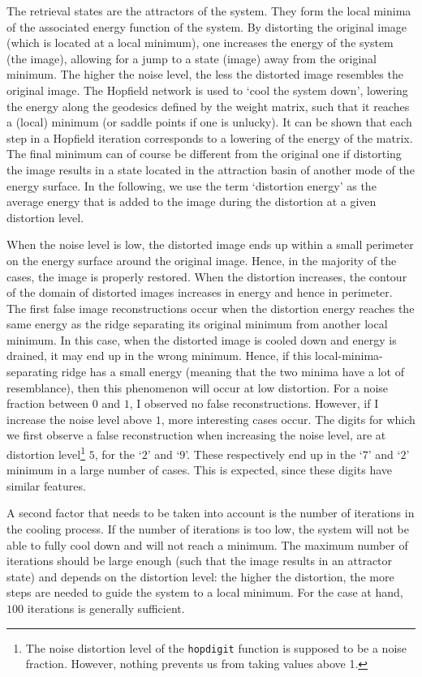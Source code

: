 \documentclass[pdftex,11pt,a4paper]{article}
\begin{document}
The retrieval states are the attractors of the system. They form the local minima of the associated energy function of the system. By distorting the original image (which is located at a local minimum), one increases the energy of the system (the image), allowing for a jump to a state (image) away from the original minimum. The higher the noise level, the less the distorted image resembles the original image. The Hopfield network is used to `cool the system down', lowering the energy along the geodesics defined by the weight matrix, such that it reaches a (local) minimum (or saddle points if one is unlucky). It can be shown that each step in a Hopfield iteration corresponds to a lowering of the energy of the matrix.
The final minimum can of course be different from the original one if distorting the image results in a state located in the attraction basin of another mode of the energy surface. In the following, we use the term `distortion energy' as the average energy that is added to the image during the distortion at a given distortion level.

When the noise level is low, the distorted image ends up within a small perimeter on the energy surface around the original image. Hence, in the majority of the cases, the image is properly restored.
When the distortion increases, the contour of the domain of distorted images increases in energy and hence in perimeter. The first false image reconstructions occur when the distortion energy reaches the same energy as the ridge separating its original minimum from another local minimum. In this case, when the distorted image is cooled down and energy is drained, it may end up in the wrong minimum. Hence, if this local-minima-separating ridge has a small energy (meaning that the two minima have a lot of resemblance), then this phenomenon will occur at low distortion.  For a noise fraction between $0$ and $1$, I observed no false reconstructions. However, if I increase the noise level above $1$, more interesting cases occur. The digits for which we first observe a false reconstruction when increasing the noise level, are at distortion level\footnote{The noise distortion level of the \texttt{hopdigit} function is supposed to be a noise fraction. However, nothing prevents us from taking values above 1.} $5$, for the `$2$' and `$9$'. These respectively end up in the `$7$' and `$2$' minimum in a large number of cases. This is expected, since these digits have similar features.

A second factor that needs to be taken into account is the number of iterations in the cooling process. If the number of iterations is too low, the system will not be able to fully cool down and will not reach a minimum. The maximum number of iterations should be large enough (such that the image results in an attractor state) and depends on the distortion level: the higher the distortion, the more steps are needed to guide the system to a local minimum. For the case at hand, $100$ iterations is generally sufficient.
\end{document}
